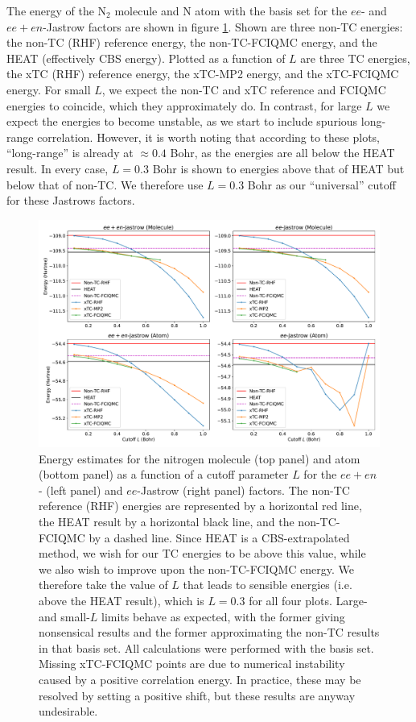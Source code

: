 The energy of the N$_2$ molecule and N atom with the \avtz basis set for the $ee$- and $ee+en$-Jastrow factors are shown in figure \ref{fig:fournais-cutoff-n2}. Shown are three non-TC energies: the non-TC (RHF) reference energy, the non-TC-FCIQMC energy, and the HEAT (effectively \gls{CBS} energy). Plotted as a function of $L$ are three TC energies, the xTC (RHF) reference energy, the xTC-MP2 energy, and the xTC-FCIQMC energy. For small $L$, we expect the non-TC and xTC reference and FCIQMC energies to coincide, which they approximately do. In contrast, for large $L$ we expect the energies to become unstable, as we start to include spurious long-range correlation. However, it is worth noting that according to these plots, ``long-range'' is already at $\approx 0.4$ Bohr, as the energies are all below the HEAT result. In every case, $L=0.3$ Bohr is shown to energies above that of HEAT but below that of non-TC. We therefore use $L=0.3$ Bohr as our ``universal'' cutoff for these Jastrows factors.

\begin{figure}[htbp]
    \centering
    \includegraphics[width=\textwidth]{figures/universal/cutoffs_combined}
    \caption{Energy estimates for the nitrogen molecule (top panel) and atom (bottom panel) as a function of a cutoff parameter $L$ for the $ee+en$- (left panel) and $ee$-Jastrow (right panel) factors. The non-TC reference (RHF) energies are represented by a horizontal red line, the HEAT result by a horizontal black line, and the non-TC-FCIQMC by a dashed line. Since HEAT is a \gls{CBS}-extrapolated method, we wish for our TC energies to be above this value, while we also wish to improve upon the non-TC-FCIQMC energy. We therefore take the value of $L$ that leads to sensible energies (i.e. above the HEAT result), which is $L=0.3$ for all four plots. Large- and small-$L$ limits behave as expected, with the former giving nonsensical results and the former approximating the non-TC results in that basis set. All calculations were performed with the \avtz basis set. Missing xTC-FCIQMC points are due to numerical instability caused by a positive correlation energy. In practice, these may be resolved by setting a positive shift, but these results are anyway undesirable.}
    \label{fig:fournais-cutoff-n2}
\end{figure}

